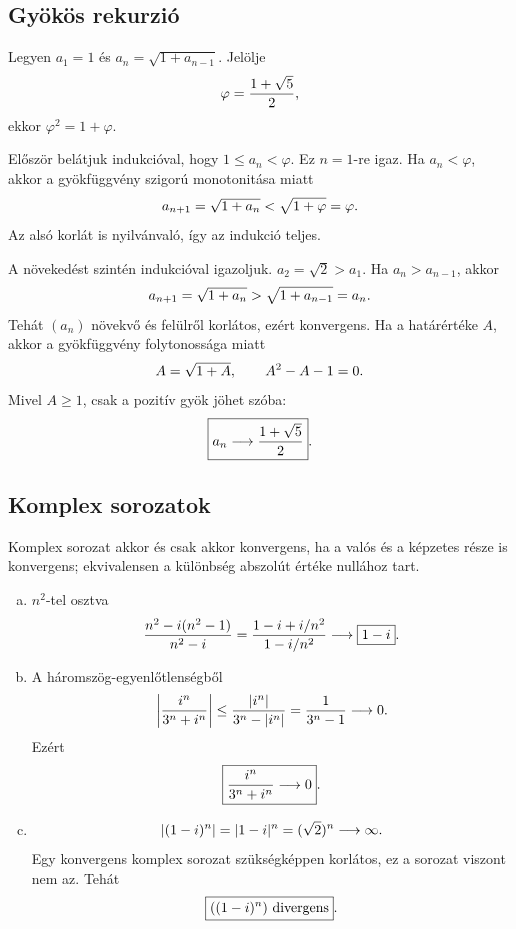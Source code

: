 \documentclass{szb-solution}
\begin{document}
\subsection{Gyökös rekurzió}

Legyen $a_1=1$ és $a_n=\sqrt{1+a_{n-1}}$. Jelölje
$$
  \varphi=\frac{1+\sqrt5}{2}
  \text,
$$
ekkor $\varphi^2=1+\varphi$.

Először belátjuk indukcióval, hogy $1\leq a_n<\varphi$. Ez $n=1$-re igaz.
Ha $a_n<\varphi$, akkor a gyökfüggvény szigorú monotonitása miatt
$$
  a_{n+1}=\sqrt{1+a_n}<\sqrt{1+\varphi}=\varphi
  \text.
$$
Az alsó korlát is nyilvánvaló, így az indukció teljes.

A növekedést szintén indukcióval igazoljuk. $a_2=\sqrt2>a_1$. Ha
$a_n>a_{n-1}$, akkor
$$
  a_{n+1}=\sqrt{1+a_n}>\sqrt{1+a_{n-1}}=a_n
  \text.
$$
Tehát $(a_n)$ növekvő és felülről korlátos, ezért konvergens. Ha a
határértéke $A$, akkor a gyökfüggvény folytonossága miatt
$$
  A=\sqrt{1+A},
  \qquad A^2-A-1=0
  \text.
$$
Mivel $A\geq1$, csak a pozitív gyök jöhet szóba:
$$
  \boxed{a_n\longrightarrow\frac{1+\sqrt5}{2}}
  \text.
$$

\subsection{Komplex sorozatok}

Komplex sorozat akkor és csak akkor konvergens, ha a valós és a képzetes
része is konvergens; ekvivalensen a különbség abszolút értéke nullához tart.

\begin{enumerate}[a)]
  \item $n^2$-tel osztva
        $$
          \frac{n^2-i(n^2-1)}{n^2-i}
          =\frac{1-i+i/n^2}{1-i/n^2}
          \longrightarrow\boxed{1-i}
          \text.
        $$

  \item A háromszög-egyenlőtlenségből
        $$
          \left|\frac{i^n}{3^n+i^n}\right|
          \leq\frac{|i^n|}{3^n-|i^n|}
          =\frac1{3^n-1}\longrightarrow0
          \text.
        $$
        Ezért
        $$
          \boxed{\frac{i^n}{3^n+i^n}\longrightarrow0}
          \text.
        $$

  \item
        $$
          |(1-i)^n|=|1-i|^n=(\sqrt2)^n\longrightarrow\infty
          \text.
        $$
        Egy konvergens komplex sorozat szükségképpen korlátos, ez a sorozat
        viszont nem az. Tehát
        $$
          \boxed{((1-i)^n)\text{ divergens}}
          \text.
        $$
\end{enumerate}
\end{document}
